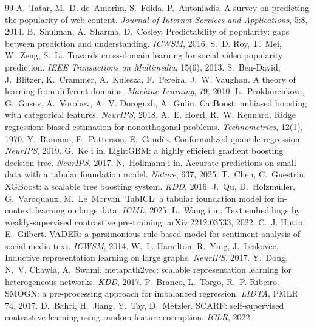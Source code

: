\documentclass[10pt,a4paper]{article}
\begin{document}
\begin{thebibliography}{99}
 A.~Tatar, M.~D. de~Amorim, S.~Fdida, P.~Antoniadis. A survey on predicting the popularity of web
  content. \emph{Journal of Internet Services and Applications}, 5:8, 2014.
 B.~Shulman, A.~Sharma, D.~Cosley. Predictability of popularity: gaps between prediction and
  understanding. \emph{ICWSM}, 2016.
 S.~D. Roy, T.~Mei, W.~Zeng, S.~Li. Towards cross-domain learning for social video popularity
  prediction. \emph{IEEE Transactions on Multimedia}, 15(6), 2013.
 S.~Ben-David, J.~Blitzer, K.~Crammer, A.~Kulesza, F.~Pereira, J.~W. Vaughan. A theory of
  learning from different domains. \emph{Machine Learning}, 79, 2010.
 L.~Prokhorenkova, G.~Gusev, A.~Vorobev, A.~V. Dorogush, A.~Gulin. CatBoost: unbiased boosting with
  categorical features. \emph{NeurIPS}, 2018.
 A.~E. Hoerl, R.~W. Kennard. Ridge regression: biased estimation for nonorthogonal problems.
  \emph{Technometrics}, 12(1), 1970.
 Y.~Romano, E.~Patterson, E.~Cand\`es. Conformalized quantile regression. \emph{NeurIPS}, 2019.
 G.~Ke i in. LightGBM: a highly efficient gradient boosting decision tree. \emph{NeurIPS}, 2017.
 N.~Hollmann i in. Accurate predictions on small data with a tabular foundation model. \emph{Nature},
  637, 2025.
 T.~Chen, C.~Guestrin. XGBoost: a scalable tree boosting system. \emph{KDD}, 2016.
 J.~Qu, D.~Holzm\"uller, G.~Varoquaux, M.~Le~Morvan. TabICL: a tabular foundation model for in-context
  learning on large data. \emph{ICML}, 2025.
 L.~Wang i in. Text embeddings by weakly-supervised contrastive pre-training. arXiv:2212.03533, 2022.
 C.~J. Hutto, E.~Gilbert. VADER: a parsimonious rule-based model for sentiment analysis of social media
  text. \emph{ICWSM}, 2014.
 W.~L. Hamilton, R.~Ying, J.~Leskovec. Inductive representation learning on large graphs.
  \emph{NeurIPS}, 2017.
 Y.~Dong, N.~V. Chawla, A.~Swami. metapath2vec: scalable representation learning for
  heterogeneous networks. \emph{KDD}, 2017.
 P.~Branco, L.~Torgo, R.~P. Ribeiro. SMOGN: a pre-processing approach for imbalanced regression.
  \emph{LIDTA}, PMLR 74, 2017.
 D.~Bahri, H.~Jiang, Y.~Tay, D.~Metzler. SCARF: self-supervised contrastive learning using random
  feature corruption. \emph{ICLR}, 2022.
\end{thebibliography}
\end{document}
